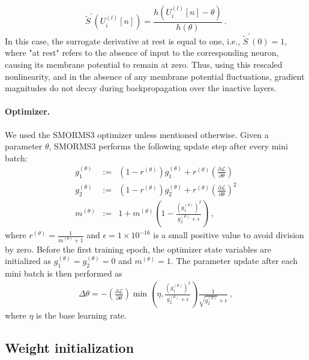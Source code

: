\documentclass[11pt,a4paper]{article}
\begin{document}
\begin{equation}
\tilde{S}^{\prime}\left(U^{(l)}_i[n]\right) = \frac{h\left(U^{(l)}_i[n] - \theta\right)}{h\left(\theta\right)}~.
\end{equation}
In this case, the surrogate derivative at rest is equal to one, i.e., $\tilde{S}^{\prime}\left(0 \right) = 1$, where "at rest" refers to the absence of input to the corresponding neuron, causing its membrane potential to remain at zero. Thus, using this rescaled nonlinearity, and in the absence of any membrane potential fluctuations, gradient magnitudes do not decay during backpropagation over the inactive layers.

\paragraph{Optimizer.}
We used the SMORMS3 optimizer \cite{Funk2015-xl} unless mentioned otherwise. Given a parameter $\theta$, SMORMS3 performs the following update step after every mini batch:
\begin{eqnarray}
	g_1^{(\theta)} &:=& \left(1 - r^{(\theta)} \right) g_1^{(\theta)} + r^{(\theta)} \left(\frac{\partial \mathcal{L}}{\partial \theta}\right) \\
	g_2^{(\theta)} &:=& \left(1 - r^{(\theta)} \right) g_2^{(\theta)} + r^{(\theta)} \left( \frac{\partial \mathcal{L}}{\partial \theta} \right)^2 \\
	m^{(\theta)} &:=& 1 + m^{(\theta)} \left(1 - \frac{\left(g_1^{(\theta)}\right)^2}{g_2^{(\theta)} + \epsilon} \right)	~,
\end{eqnarray}
where $r^{(\theta)} = \frac{1}{m^{(\theta)}+1}$ and $\epsilon = 1 \times 10^{-16}$ is a small positive value to avoid division by zero. 
Before the first training epoch, the optimizer state variables are initialized as $g_1^{(\theta)} = g_2^{(\theta)} = 0$ and $m^{(\theta)} = 1$. 
The parameter update after each mini batch is then performed as
\begin{eqnarray}
	\Delta \theta = - \left(\frac{\partial \mathcal{L}}{\partial \theta}\right) \min \left( \eta, \frac{\left(g_1^{(\theta)}\right)^2}{g_2^{(\theta)} + \epsilon} \right) \frac{1}{\sqrt{g_2^{(\theta)}} + \epsilon}~,
\end{eqnarray}
where $\eta$ is the base learning rate.



\subsection*{Weight initialization}
\end{document}
